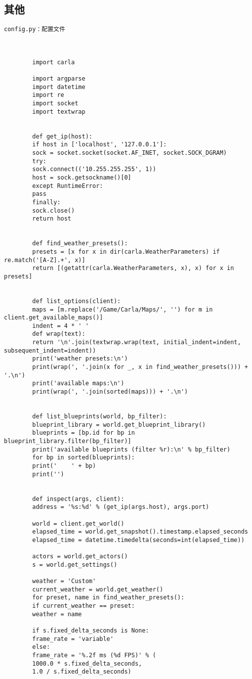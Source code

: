 \subsection{其他}
\begin{lstlisting}
config.py：配置文件



		import carla
		
		import argparse
		import datetime
		import re
		import socket
		import textwrap
		
		
		def get_ip(host):
		if host in ['localhost', '127.0.0.1']:
		sock = socket.socket(socket.AF_INET, socket.SOCK_DGRAM)
		try:
		sock.connect(('10.255.255.255', 1))
		host = sock.getsockname()[0]
		except RuntimeError:
		pass
		finally:
		sock.close()
		return host
		
		
		def find_weather_presets():
		presets = [x for x in dir(carla.WeatherParameters) if re.match('[A-Z].+', x)]
		return [(getattr(carla.WeatherParameters, x), x) for x in presets]
		
		
		def list_options(client):
		maps = [m.replace('/Game/Carla/Maps/', '') for m in client.get_available_maps()]
		indent = 4 * ' '
		def wrap(text):
		return '\n'.join(textwrap.wrap(text, initial_indent=indent, subsequent_indent=indent))
		print('weather presets:\n')
		print(wrap(', '.join(x for _, x in find_weather_presets())) + '.\n')
		print('available maps:\n')
		print(wrap(', '.join(sorted(maps))) + '.\n')
		
		
		def list_blueprints(world, bp_filter):
		blueprint_library = world.get_blueprint_library()
		blueprints = [bp.id for bp in blueprint_library.filter(bp_filter)]
		print('available blueprints (filter %r):\n' % bp_filter)
		for bp in sorted(blueprints):
		print('    ' + bp)
		print('')
		
		
		def inspect(args, client):
		address = '%s:%d' % (get_ip(args.host), args.port)
		
		world = client.get_world()
		elapsed_time = world.get_snapshot().timestamp.elapsed_seconds
		elapsed_time = datetime.timedelta(seconds=int(elapsed_time))
		
		actors = world.get_actors()
		s = world.get_settings()
		
		weather = 'Custom'
		current_weather = world.get_weather()
		for preset, name in find_weather_presets():
		if current_weather == preset:
		weather = name
		
		if s.fixed_delta_seconds is None:
		frame_rate = 'variable'
		else:
		frame_rate = '%.2f ms (%d FPS)' % (
		1000.0 * s.fixed_delta_seconds,
		1.0 / s.fixed_delta_seconds)
		

\end{lstlisting}
